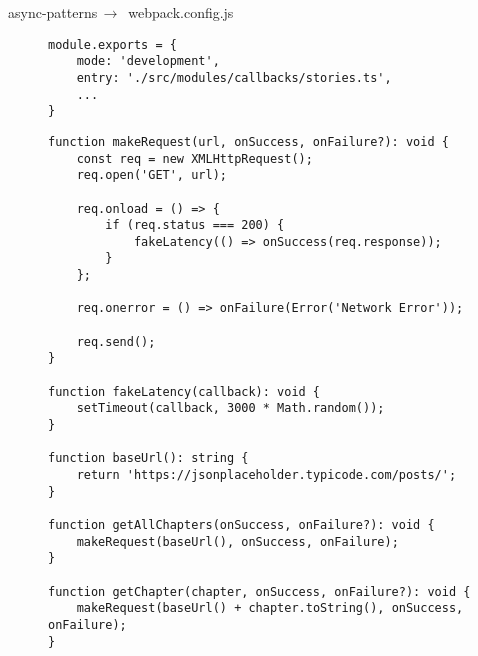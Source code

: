 \begin{center}
    async-patterns$\,\to\,$ webpack.config.js
\end{center}

\begin{figure}[H]
\begin{lstlisting}[basicstyle=\small]
module.exports = {
    mode: 'development',
    entry: './src/modules/callbacks/stories.ts',
    ...
}
\end{lstlisting}
\end{figure}

\begin{figure}[H]
\begin{lstlisting}[basicstyle=\small]
function makeRequest(url, onSuccess, onFailure?): void {
    const req = new XMLHttpRequest();
    req.open('GET', url);

    req.onload = () => {
        if (req.status === 200) {
            fakeLatency(() => onSuccess(req.response));
        }
    };

    req.onerror = () => onFailure(Error('Network Error'));

    req.send();
}

function fakeLatency(callback): void {
    setTimeout(callback, 3000 * Math.random());
}

function baseUrl(): string {
    return 'https://jsonplaceholder.typicode.com/posts/';
}

function getAllChapters(onSuccess, onFailure?): void {
    makeRequest(baseUrl(), onSuccess, onFailure);
}

function getChapter(chapter, onSuccess, onFailure?): void {
    makeRequest(baseUrl() + chapter.toString(), onSuccess, onFailure);
}
\end{lstlisting}
\end{figure}

